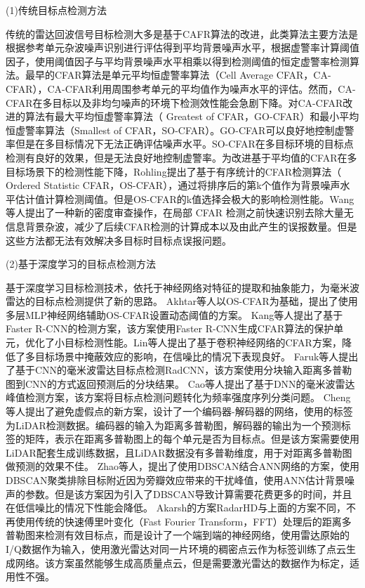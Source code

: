 \par
(1)传统目标点检测方法
\par
传统的雷达回波信号目标检测大多是基于CAFR算法的改进，此类算法主要方法是根据参考单元杂波噪声识别进行评估得到平均背景噪声水平，根据虚警率计算阈值因子，使用阈值因子与平均背景噪声水平相乘以得到检测阈值的恒定虚警率检测算法。最早的CFAR算法是单元平均恒虚警率算法（Cell Average CFAR，CA-CFAR）\cite{4043676}，CA-CFAR利用周围参考单元的平均值作为噪声水平的评估。然而，CA-CFAR在多目标以及非均匀噪声的环境下检测效性能会急剧下降。对CA-CFAR改进的算法有最大平均恒虚警率算法（ Greatest of CFAR，GO-CFAR）\cite{4102285}和最小平均恒虚警率算法（Smallest of CFAR，SO-CFAR）\cite{trunk1978range}。GO-CFAR可以良好地控制虚警率但是在多目标情况下无法正确评估噪声水平。SO-CFAR在多目标环境的目标点检测有良好的效果，但是无法良好地控制虚警率。为改进基于平均值的CFAR在多目标场景下的检测性能下降，Rohling提出了基于有序统计的CFAR检测算法（ Ordered Statistic CFAR，OS-CFAR）\cite{4102829}，通过将排序后的第k个值作为背景噪声水平估计值计算检测阈值。但是OS-CFAR的k值选择会极大的影响检测性能。Wang等人提出了一种新的密度审查操作\cite{WangCFAR}，在局部 CFAR 检测之前快速识别去除大量无信息背景杂波，减少了后续CFAR检测的计算成本以及由此产生的误报数量。但是这些方法都无法有效解决多目标时目标点误报问题。

\par
(2)基于深度学习的目标点检测方法
\par
基于深度学习目标检测技术，依托于神经网络对特征的提取和抽象能力，为毫米波雷达的目标点检测提供了新的思路\cite{mata2015mlp}。
Akhtar等人以OS-CFAR为基础，提出了使用多层MLP神经网络辅助OS-CFAR设置动态阈值的方案\cite{akhtar2021training}。
Kang等人提出了基于Faster R-CNN的检测方案\cite{R-CNN-CFAR}，该方案使用Faster R-CNN生成CFAR算法的保护单元，优化了小目标检测性能。Lin等人提出了基于卷积神经网络的CFAR方案\cite{DL-CFAR}，降低了多目标场景中掩蔽效应的影响，在信噪比的情况下表现良好。
Faruk等人提出了基于CNN\cite{lecun1989backpropagation}的毫米波雷达目标点检测RadCNN\cite{CNN-CFAR}，该方案使用分块输入距离多普勒图到CNN的方式返回预测后的分块结果。
Cao等人提出了基于DNN\cite{DBLP:conf/nips/KrizhevskySH12}的毫米波雷达峰值检测方案\cite{DNN-CFAR}，该方案将目标点检测问题转化为频率强度序列分类问题。
Cheng等人提出了避免虚假点的新方案\cite{9823311}，设计了一个编码器-解码器的网络，使用的标签为LiDAR检测数据。编码器的输入为距离多普勒图，解码器的输出为一个预测标签的矩阵，表示在距离多普勒图上的每个单元是否为目标点。但是该方案需要使用LiDAR配套生成训练数据，且LiDAR数据没有多普勒维度，用于对距离多普勒图做预测的效果不佳。
Zhao等人，提出了使用DBSCAN\cite{schubert2017dbscan}结合ANN网络\cite{agatonovic2000basic}的方案，使用DBSCAN聚类排除目标附近因为旁瓣效应带来的干扰峰值，使用ANN估计背景噪声的参数\cite{sym11121482}。但是该方案因为引入了DBSCAN导致计算需要花费更多的时间，并且在低信噪比的情况下性能会降低。
Akarsh的方案RadarHD\cite{10161429}与上面的方案不同，不再使用传统的快速傅里叶变化（Fast Fourier Transform，FFT）处理后的距离多普勒图来检测有效目标点，而是设计了一个端到端的神经网络，使用雷达原始的I/Q数据作为输入，使用激光雷达对同一片环境的稠密点云作为标签训练了点云生成网络。该方案虽然能够生成高质量点云，但是需要激光雷达的数据作为标定，适用性不强。
